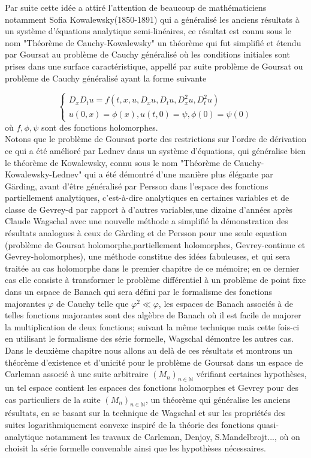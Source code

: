 \documentclass[12pt,a4paper]{report}
\theoremstyle{plain}
\theoremstyle{definition}
\theoremstyle{remark}
\newcommand{\N}{\ensuremath{\mathbb{N}}}
\begin{document}
Par suite cette idée a attiré l'attention de beaucoup de mathématiciens notamment Sofia Kowalewsky(1850-1891) qui a généralisé les anciens résultats à un système d'équations analytique semi-linéaires, ce résultat est connu sous le nom "Théorème de Cauchy-Kowalewsky" un théorème qui fut simplifié et étendu par Goursat au problème de Cauchy généralisé où les conditions initiales sont prises dans une surface caractéristique, appellé par suite problème de Goursat ou problème de Cauchy généralisé ayant la forme suivante 

\begin{equation*}
\left\{
\begin{array}{l}
D_xD_t u = f(t,x,u,D_xu,D_tu,D_x^2u,D_t^2u) \\
u(0,x)=\phi(x), u(t,0)=\psi, \phi(0)=\psi(0)
\end{array}
\right.
\end{equation*}
où $f, \phi, \psi$ sont des fonctions holomorphes.\\
Notons que le problème de Goursat porte des restrictions sur l'ordre de dérivation ce qui a été amélioré par Lednev dans un système d'équations, qui généralise bien le théorème de Kowalewsky, connu sous le nom "Théorème de Cauchy-Kowalewsky-Lednev" qui a été démontré d'une manière plus élégante par Gärding, avant d'être généralisé par Persson dans l'espace des fonctions partiellement analytiques, c'est-à-dire analytiques en certaines variables et de classe de Gevrey-d par rapport à d'autres variables,une dizaine d'années après Claude Wagschal avec une nouvelle méthode a simplifié la démonstration des résultats analogues à ceux de Gàrding et de Persson pour une seule equation (problème de Goursat holomorphe,partiellement holomorphes, Gevrey-continue et Gevrey-holomorphes), une méthode constitue des idées fabuleuses, et qui sera traitée au cas holomorphe dans le premier chapitre de ce mémoire; en ce dernier cas elle consiste à transformer le problème différentiel à un problème de point fixe dans un espace de Banach qui sera défini par le formalisme des fonctions majorantes $\varphi$ de Cauchy telle que $\varphi^2 \ll \varphi$, les espaces de Banach associés à de telles fonctions majorantes sont des algèbre de Banach où il est facile de majorer la multiplication de deux fonctions; suivant la même technique mais cette fois-ci en utilisant le formalisme des série formelle, Wagschal démontre les autres cas. Dans le deuxième chapitre nous allons au delà de ces résultats et montrons un théorème d'existence et d'unicité pour le problème de Goursat dans un espace de Carleman associé à une suite arbitraire $(M_n)_{n \in \N}$ vérifiant certaines hypothèses, un tel espace contient les espaces des fonctions holomorphes et Gevrey pour des cas particuliers de la suite $(M_n)_{n \in \N}$, un théorème qui généralise les anciens résultats, en se basant sur la technique de Wagschal et sur les propriétés des suites logarithmiquement convexe inspiré de la théorie des fonctions quasi-analytique notamment les travaux de Carleman, Denjoy, S.Mandelbrojt..., où on choisit la série formelle convenable ainsi que les hypothèses nécessaires.
\end{document}
